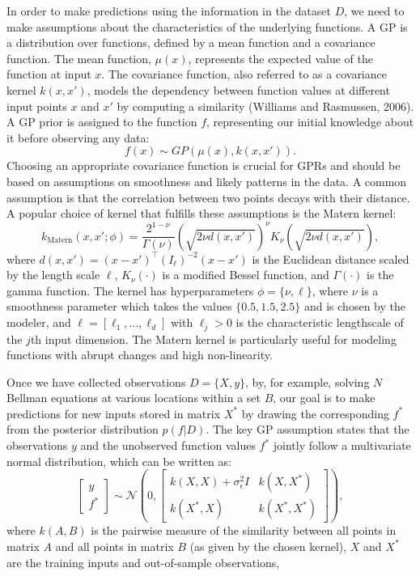 \documentclass[10pt,a4paper]{article}
\numberwithin{equation}{section} %
\begin{document}
In order to make predictions using the information in the dataset $D$, we need to
make assumptions about the characteristics of the underlying functions. A GP is a
distribution over functions, defined by a mean function and a covariance function.
The mean function, $\mu(x)$, represents the expected value of the function at input $x$.
The covariance function, also referred to as a covariance kernel $k(x, x')$, models the
dependency between function values at different input points $x$ and $x'$ by computing
a similarity (Williams and Rasmussen, 2006). A GP prior is assigned to the function
$f$, representing our initial knowledge about it before observing any data:
\[
f(x) \sim GP(\mu(x), k(x, x')).
\]
Choosing an appropriate covariance function is crucial for GPRs and should be based
on assumptions on smoothness and likely patterns in the data. A common assumption
is that the correlation between two points decays with their distance. A popular choice
of kernel that fulfills these assumptions is the Matern kernel:
\[
k_{\text{Matern}}(x, x'; \phi) = \frac{2^{1-\nu}}{\Gamma(\nu)}
\left(\sqrt{2\nu d(x, x')}\right)^{\nu} K_{\nu} \left(\sqrt{2\nu d(x, x')}\right),
\]
where $d(x, x') = (x - x')^\top (I_\ell)^{-2}(x - x')$ is the Euclidean distance scaled 
by the length scale $\ell$, $K_\nu(\cdot)$ is a modified Bessel function, and $\Gamma(\cdot)$ is the 
gamma function. The kernel has hyperparameters $\phi = \{\nu, \ell\}$, where $\nu$ is a smoothness 
parameter which takes the values $\{0.5, 1.5, 2.5\}$ and is chosen by the modeler, and 
$\ell = [\ell_1, \ldots, \ell_d]$ with $\ell_j > 0$ is the characteristic lengthscale of the $j$th 
input dimension. The Matern kernel is particularly useful for modeling functions with abrupt 
changes and high non-linearity.

Once we have collected observations $D = \{X, y\}$, by, for example, solving $N$ Bellman
equations at various locations within a set $B$, our goal is to make predictions for
new inputs stored in matrix $X^*$ by drawing the corresponding $f^*$ from the posterior
distribution $p(f|D)$. The key GP assumption states that the observations $y$ and the
unobserved function values $f^*$ jointly follow a multivariate normal distribution, which
can be written as:
\[
\left[\begin{array}{c} y \\ f^* \end{array}\right] \sim \mathcal{N}
\left(0, \left[\begin{array}{cc}
k(X, X) + \sigma_{\epsilon}^2 I & k(X, X^*) \\
k(X^*, X) & k(X^*, X^*)
\end{array}\right]\right),
\]
where $k(A, B)$ is the pairwise measure of the similarity between all points in matrix $A$
and all points in matrix $B$ (as given by the chosen kernel), $X$ and $X^*$ are the training 
inputs and out-of-sample observations,
\end{document}
